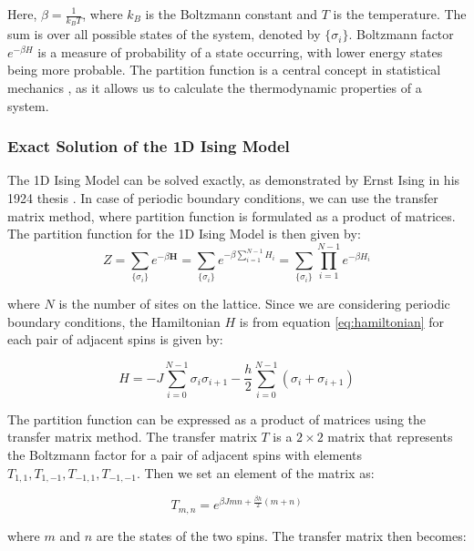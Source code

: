 Here, $\beta = \frac{1}{k_B T}$, where $k_B$ is the Boltzmann constant and $T$
is the temperature. The sum is over all possible states of the system, denoted
by $\{\sigma_i\}$. Boltzmann factor $e^{-\beta H}$ is a measure of probability
of a state occurring, with lower energy states being more probable. The
partition function is a central concept in statistical mechanics
\cite{Kardar2013} \cite{Yoshioka2007}, as it allows us to calculate the
thermodynamic properties of a system.

\subsubsection{Exact Solution of the 1D Ising Model}
The 1D Ising Model can be solved exactly, as demonstrated by Ernst Ising in his
1924 thesis \cite{Ising1925}. In case of periodic boundary conditions, we can
use the transfer matrix method, where partition function is formulated as a
product of matrices. The partition function for the 1D Ising Model is then given
by:
\begin{equation}
  \label{eq:partition1d}
  Z = \sum_{\{\sigma_i\}} e^{-\beta \textbf{H}} = \sum_{\{\sigma_i\}} e^{-\beta \sum_{i=1}^{N-1} H_i} = \sum_{\{\sigma_i\}} \prod_{i=1}^{N-1} e^{-\beta H_i}
\end{equation}

where \( N \) is the number of sites on the lattice. Since we are considering
periodic boundary conditions, the Hamiltonian \( H \) is from equation
\ref{eq:hamiltonian} for each pair of adjacent spins is given by:

\begin{equation}
  \label{eq:hamiltonian1d}
  H = -J \sum_{i=0}^{N-1}\sigma_i \sigma_{i+1} - \frac{h}{2} \sum_{i=0}^{N-1}(\sigma_i + \sigma_{i+1})
\end{equation}

The partition function can be expressed as a product of matrices using the
transfer matrix method. The transfer matrix \( T \) is a \( 2 \times 2 \) matrix
that represents the Boltzmann factor for a pair of adjacent spins with elements
$T_{1,1}, T_{1,-1}, T_{-1,1}, T_{-1,-1}$. Then we set an element of the matrix
as:

\begin{equation}
  \label{eq:transfer_element}
  T_{m,n} = e^{\beta J m n + \frac{\beta h}{2}\left(m+n\right)}
\end{equation}

where \( m \) and \( n \) are the states of the two spins. The transfer matrix
then becomes:

